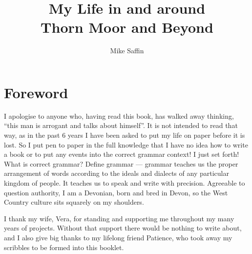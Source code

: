 \documentclass[twoside,11pt,a5paper]{memoir}
\title{My Life in and around\\Thorn Moor and Beyond}
\author{Mike Saffin}
\date{}
\begin{document}
% 

\maketitle

\chapter*{Foreword}

I apologise to anyone who, having read this book, has walked away thinking,
``this man is arrogant and talks about himself''. It is not intended to read
that way, as in the past 6 years I have been asked to put my life on paper
before it is lost. So I put pen to paper in the full knowledge that I have no
idea how to write a book or to put any events into the correct grammar
context! I just set forth! What is correct grammar? Define grammar --- grammar
teaches us the proper arrangement of words according to the ideals and dialects
of any particular kingdom of people. It teaches us to speak and write with
precision. Agreeable to question authority, I am a Devonian, born and bred in
Devon, so the West Country culture sits squarely on my shoulders.

I thank my wife, Vera, for standing and supporting me throughout my many years
of projects. Without that support there would be nothing to write about, and I
also give big thanks to my lifelong friend Patience, who took away my scribbles
to be formed into this booklet.

\chapter{}

\chapter{}

\chapter{}

\chapter{}

\chapter{}

\chapter{}

\end{document}
